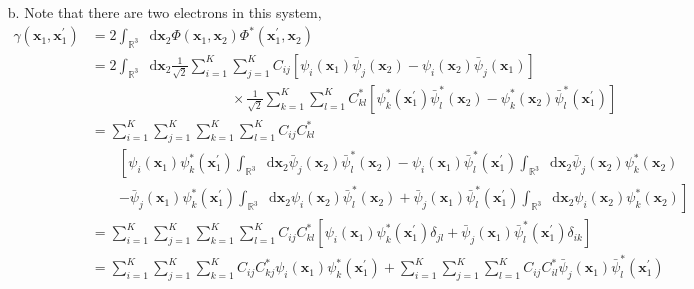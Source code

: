 \documentclass[a4paper]{book}
\newcounter{solution}[chapter]
\newcommand*{\dif}{\mathop{}\!\mathrm{d}}
\begin{document}
\begin{solution}
\begin{enumerate}
	\item[b.] Note that there are two electrons in this system,
	\begin{align*}
		\gamma( \boldsymbol{x}_1 , \boldsymbol{x}^\prime_1 ) &= 2 \int_{ \mathbb{R}^3 } \dif \boldsymbol{x}_2 \Phi( \boldsymbol{x}_1 , \boldsymbol{x}_2 ) \Phi^*( \boldsymbol{x}^\prime_1 , \boldsymbol{x}_2 )  \\
		&= 2 \int_{ \mathbb{R}^3 } \dif \boldsymbol{x}_2 \frac{1}{ \sqrt{2} } \sum_{ i=1 }^K \sum_{ j=1 }^K C_{ij} \left[ \psi_i( \boldsymbol{x}_1 ) \bar{\psi}_j( \boldsymbol{x}_2 ) - \psi_i( \boldsymbol{x}_2 ) \bar{\psi}_j( \boldsymbol{x}_1 ) \right] \\
		&\hspace{10em} \times \frac{1}{ \sqrt{2} } \sum_{ k=1 }^K \sum_{ l=1 }^K C^*_{kl} \left[ \psi^*_k( \boldsymbol{x}^\prime_1 ) \bar{\psi}^*_l( \boldsymbol{x}_2 ) - \psi^*_k( \boldsymbol{x}_2 ) \bar{\psi}^*_l( \boldsymbol{x}^\prime_1 ) \right] \\
		&= \sum_{ i=1 }^K \sum_{ j=1 }^K \sum_{ k=1 }^K \sum_{ l=1 }^K C_{ij} C^*_{kl} \\ 
		&\hspace{2em}\left[ \psi_i( \boldsymbol{x}_1 ) \psi^*_k( \boldsymbol{x}^\prime_1 ) \int_{ \mathbb{R}^3 } \dif \boldsymbol{x}_2 \bar{\psi}_j( \boldsymbol{x}_2 ) \bar{\psi}^*_l( \boldsymbol{x}_2 ) - \psi_i( \boldsymbol{x}_1 ) \bar{\psi}^*_l( \boldsymbol{x}^\prime_1 ) \int_{ \mathbb{R}^3 } \dif \boldsymbol{x}_2 \bar{\psi}_j( \boldsymbol{x}_2 ) \psi^*_k( \boldsymbol{x}_2 ) \right. \\
		&\hspace{2em} \left. - \bar{\psi}_j( \boldsymbol{x}_1 ) \psi^*_k( \boldsymbol{x}^\prime_1 ) \int_{ \mathbb{R}^3 } \dif \boldsymbol{x}_2 \psi_i( \boldsymbol{x}_2 ) \bar{\psi}^*_l( \boldsymbol{x}_2 ) + \bar{\psi}_j( \boldsymbol{x}_1 ) \bar{\psi}^*_l( \boldsymbol{x}^\prime_1 ) \int_{ \mathbb{R}^3 } \dif \boldsymbol{x}_2 \psi_i( \boldsymbol{x}_2 ) \psi^*_k( \boldsymbol{x}_2 ) \right] \\
		&= \sum_{ i=1 }^K \sum_{ j=1 }^K \sum_{ k=1 }^K \sum_{ l=1 }^K C_{ij} C^*_{kl} \left[ \psi_i( \boldsymbol{x}_1 ) \psi^*_k( \boldsymbol{x}^\prime_1 ) \delta_{jl} + \bar{\psi}_j( \boldsymbol{x}_1 ) \bar{\psi}^*_l( \boldsymbol{x}^\prime_1 ) \delta_{ik} \right] \\
		&= \sum_{ i=1 }^K \sum_{ j=1 }^K \sum_{ k=1 }^K C_{ij} C^*_{kj} \psi_i( \boldsymbol{x}_1 ) \psi^*_k( \boldsymbol{x}^\prime_1 ) + \sum_{ i=1 }^K \sum_{ j=1 }^K \sum_{ l=1 }^K C_{ij} C^*_{il} \bar{\psi}_j( \boldsymbol{x}_1 ) \bar{\psi}^*_l( \boldsymbol{x}^\prime_1 ) \\

\end{align*}
\end{enumerate}
\end{solution}
\end{document}
